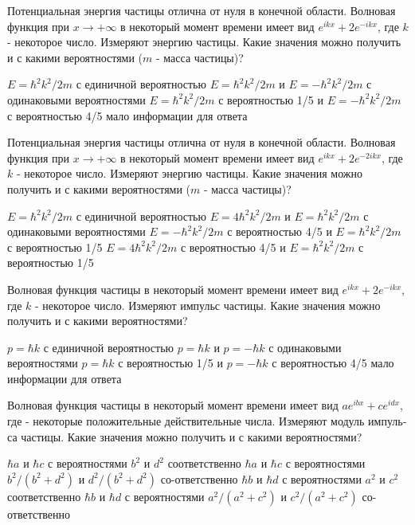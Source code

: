 \documentclass[11pt,a4paper]{exam}
\begin{document}
\begin{questions}
\question Потенциальная энергия частицы отлична от нуля в конечной области. Волновая функция при $x \to  + \infty $ в некоторый момент времени имеет вид ${e^{ikx}} + 2{e^{ - ikx}}$, где $k$ - некоторое число. Измеряют энергию частицы. Какие значения можно получить и с какими вероятностями ($m$ - масса частицы)?
\begin{choices}
\choice $E = {\hbar ^2}{k^2}/2m$ с единичной вероятностью
\choice $E = {\hbar ^2}{k^2}/2m$ и $E =  - {\hbar ^2}{k^2}/2m$ с одинаковыми вероятностями
\choice $E = {\hbar ^2}{k^2}/2m$  с вероятностью 1/5 и $E =  - {\hbar ^2}{k^2}/2m$ с вероятностью 4/5
\choice мало информации для ответа
\end{choices}

\question Потенциальная энергия частицы отлична от нуля в конечной области. Волновая функция при $x \to  + \infty $ в некоторый момент времени имеет вид ${e^{ikx}} + 2{e^{ - 2ikx}}$, где $k$ - некоторое число. Измеряют энергию частицы. Какие значения можно получить и с какими вероятностями ($m$ - масса частицы)?
\begin{choices}
\choice $E = {\hbar ^2}{k^2}/2m$ с единичной вероятностью
\choice $E = 4{\hbar ^2}{k^2}/2m$ и $E = {\hbar ^2}{k^2}/2m$ с одинаковыми вероятностями
\choice $E =  - {\hbar ^2}{k^2}/2m$ с вероятностью 4/5 и $E = {\hbar ^2}{k^2}/2m$ с вероятностью 1/5
\choice $E = 4{\hbar ^2}{k^2}/2m$ с вероятностью 4/5 и $E = {\hbar ^2}{k^2}/2m$ с вероятностью 1/5 
\end{choices}

\question Волновая функция частицы в некоторый момент времени имеет вид ${e^{ikx}} + 2{e^{ - ikx}}$, где $k$ - некоторое число. Измеряют импульс частицы. Какие значения можно получить и с какими вероятностями?
\begin{choices}
\choice $p = \hbar k$ с единичной вероятностью
\choice $p = \hbar k$ и $p =  - \hbar k$ с одинаковыми вероятностями
\choice $p = \hbar k$ с вероятностью 1/5 и $p =  - \hbar k$ с вероятностью 4/5
\choice мало информации для ответа
\end{choices}

\question Волновая функция частицы в некоторый момент времени имеет вид $a{e^{ibx}} + c{e^{idx}}$, где  - некоторые положительные действительные числа. Измеряют модуль импуль-са частицы. Какие значения можно получить и с какими вероятностями?
\begin{choices}
\choice $\hbar a$ и $\hbar c$ с вероятностями ${b^2}$ и ${d^2}$ соответственно
\choice $\hbar a$ и $\hbar c$ с вероятностями ${b^2}/({b^2} + {d^2})$ и ${d^2}/({b^2} + {d^2})$ со-ответственно
\choice $\hbar b$ и $\hbar d$ с вероятностями ${a^2}$ и ${c^2}$ соответственно
\choice $\hbar b$ и $\hbar d$ с вероятностями ${a^2}/({a^2} + {c^2})$ и ${c^2}/({a^2} + {c^2})$ со-ответственно
\end{choices}


\end{questions}
\end{document}
